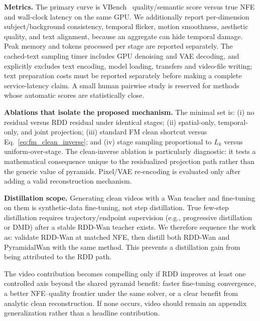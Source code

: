 \documentclass[10pt]{article}
\begin{document}
\textbf{Metrics.}
The primary curve is VBench~\citep{huang2024vbench} quality/semantic score versus true NFE and wall-clock latency on the same GPU. We additionally report per-dimension subject/background consistency, temporal flicker, motion smoothness, aesthetic quality, and text alignment, because an aggregate can hide temporal damage. Peak memory and tokens processed per stage are reported separately. The cached-text sampling timer includes GPU denoising and VAE decoding, and explicitly excludes text encoding, model loading, transfers and video-file writing; text preparation costs must be reported separately before making a complete service-latency claim. A small human pairwise study is reserved for methods whose automatic scores are statistically close.

\textbf{Ablations that isolate the proposed mechanism.}
The minimal set is: (i) no residual versus RDD residual under identical stages; (ii) spatial-only, temporal-only, and joint projection; (iii) standard FM clean shortcut versus Eq.~\eqref{eq:fm_clean_inverse}; and (iv) stage sampling proportional to $L_k$ versus uniform-over-stage. The clean-inverse ablation is particularly diagnostic: it tests a mathematical consequence unique to the residualized projection path rather than the generic value of pyramids. Pixel/VAE re-encoding is evaluated only after adding a valid reconstruction mechanism.

\textbf{Distillation scope.}
Generating clean videos with a Wan teacher and fine-tuning on them is synthetic-data fine-tuning, not step distillation. True few-step distillation requires trajectory/endpoint supervision (e.g., progressive distillation or DMD) after a stable RDD-Wan teacher exists. We therefore sequence the work as: validate RDD-Wan at matched NFE, then distill both RDD-Wan and PyramidalWan with the same method. This prevents a distillation gain from being attributed to the RDD path.

The video contribution becomes compelling only if RDD improves at least one controlled axis beyond the shared pyramid benefit: faster fine-tuning convergence, a better NFE--quality frontier under the same solver, or a clear benefit from analytic clean reconstruction. If none occurs, video should remain an appendix generalization rather than a headline contribution.

\iffalse
\end{document}
